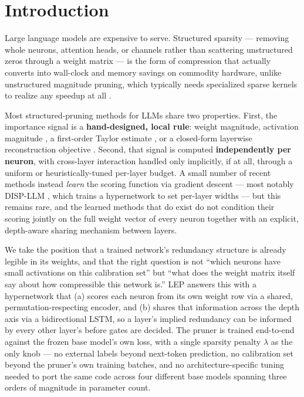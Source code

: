 \documentclass[11pt]{article}
\begin{document}
\section{Introduction}
\label{sec:intro}

Large language models are expensive to serve. Structured sparsity --- removing
whole neurons, attention heads, or channels rather than scattering
unstructured zeros through a weight matrix --- is the form of compression that
actually converts into wall-clock and memory savings on commodity hardware,
unlike unstructured magnitude pruning, which typically needs specialized
sparse kernels to realize any speedup at all \citep{frantar2023sparsegpt,sun2023wanda}.

Most structured-pruning methods for LLMs share two properties. First, the
importance signal is a \textbf{hand-designed, local rule}: weight magnitude,
activation magnitude \citep{hu2016network}, a first-order Taylor estimate
\citep{molchanov2017pruning,ma2023llmpruner}, or a closed-form layerwise
reconstruction objective \citep{frantar2023sparsegpt,sun2023wanda,guo2025slimllm}. Second, that signal is computed \textbf{independently per neuron}, with
cross-layer interaction handled only implicitly, if at all, through a
uniform or heuristically-tuned per-layer budget. A small number of recent
methods instead \emph{learn} the scoring function via gradient descent --- most
notably DISP-LLM \citep{gao2024displlm}, which trains a hypernetwork to set
per-layer widths --- but this remains rare, and the learned methods that do
exist do not condition their scoring jointly on the full weight vector of
every neuron together with an explicit, depth-aware sharing mechanism between
layers.

We take the position that a trained network's redundancy structure is
already legible in its weights, and that the right question is not ``which
neurons have small activations on this calibration set'' but ``what does the
weight matrix itself say about how compressible this network is.'' LEP
answers this with a hypernetwork that (a) scores each neuron from its own
weight row via a shared, permutation-respecting encoder, and (b) shares that
information across the depth axis via a bidirectional LSTM, so a layer's
implied redundancy can be informed by every other layer's before gates are
decided. The pruner is trained end-to-end against the frozen base model's own
loss, with a single sparsity penalty $\lambda$ as the only knob --- no external
labels beyond next-token prediction, no calibration set beyond the pruner's
own training batches, and no architecture-specific tuning needed to port the
same code across four different base models spanning three orders of
magnitude in parameter count.
\end{document}
